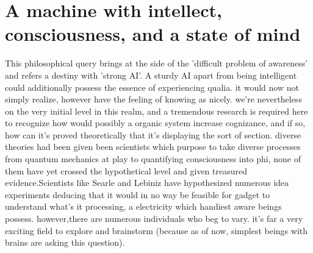 \documentclass{article}
\begin{document}
\section{A machine with intellect, consciousness, and a state of mind}
This philosophical query brings at the side of the ’difficult problem of awareness’ and refers a destiny with ’strong AI’. A sturdy AI apart from being intelligent could additionally possess the essence of experiencing qualia. it would now not simply realize, however have the feeling of knowing as nicely. we're nevertheless on the very initial level in this realm, and a tremendous research is required here to recognize how would possibly a organic system increase cognizance, and if so, how can it's proved theoretically that it’s displaying the sort of section. diverse theories had been given been scientists which purpose to take diverse processes from quantum mechanics at play to quantifying consciousness into phi, none of them have yet crossed the hypothetical level and given treasured evidence.Scientists like Searle and Lebiniz have hypothesized numerous idea experiments deducing that it would in no way be feasible for gadget to understand what’s it processing, a electricity which handiest aware beings possess. however,there are numerous individuals who beg to vary. it's far a very exciting field to explore and brainstorm (because as of now, simplest beings with brains are asking this question).
\end{document}
